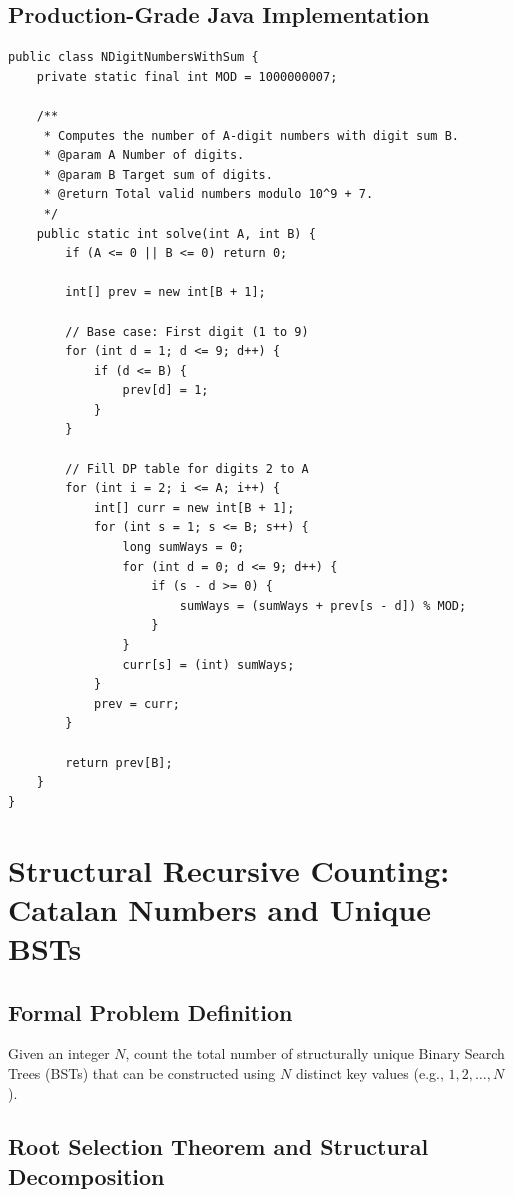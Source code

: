 \documentclass[10pt,journal,compsoc,onecolumn]{IEEEtran}
\begin{document}
\subsection{Production-Grade Java Implementation}

\begin{verbatim}
public class NDigitNumbersWithSum {
    private static final int MOD = 1000000007;

    /**
     * Computes the number of A-digit numbers with digit sum B.
     * @param A Number of digits.
     * @param B Target sum of digits.
     * @return Total valid numbers modulo 10^9 + 7.
     */
    public static int solve(int A, int B) {
        if (A <= 0 || B <= 0) return 0;

        int[] prev = new int[B + 1];

        // Base case: First digit (1 to 9)
        for (int d = 1; d <= 9; d++) {
            if (d <= B) {
                prev[d] = 1;
            }
        }

        // Fill DP table for digits 2 to A
        for (int i = 2; i <= A; i++) {
            int[] curr = new int[B + 1];
            for (int s = 1; s <= B; s++) {
                long sumWays = 0;
                for (int d = 0; d <= 9; d++) {
                    if (s - d >= 0) {
                        sumWays = (sumWays + prev[s - d]) % MOD;
                    }
                }
                curr[s] = (int) sumWays;
            }
            prev = curr;
        }

        return prev[B];
    }
}
\end{verbatim}

\section{Structural Recursive Counting: Catalan Numbers and Unique BSTs}
\label{sec:catalan-numbers}

\subsection{Formal Problem Definition}

Given an integer $N$, count the total number of structurally unique Binary Search Trees (BSTs) that can be constructed using $N$ distinct key values (e.g., $1, 2, \dots, N$).

\subsection{Root Selection Theorem and Structural Decomposition}
\end{document}
